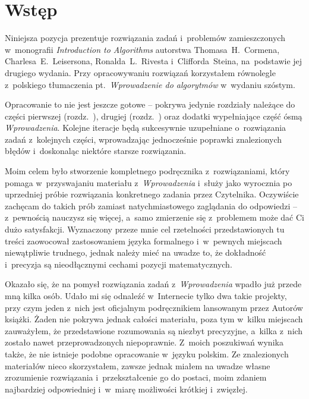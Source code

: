 \chapter{Wstęp}

Niniejsza pozycja prezentuje rozwiązania zadań i~problemów zamieszczonych w~monografii \textsl{Introduction to Algorithms} \cite{cormen} autorstwa Thomasa~H.~Cormena, Charlesa~E.~Leisersona, Ronalda~L.~Rivesta i~Clifforda~Steina, na~podstawie jej drugiego wydania. Przy opracowywaniu rozwiązań korzystałem równolegle z~polskiego tłumaczenia pt.~\textsl{Wprowadzenie do algorytmów} \cite{cormenpl} w~wydaniu szóstym.

Opracowanie to nie jest jeszcze gotowe -- pokrywa jedynie rozdziały należące do części pierwszej (rozdz.~), drugiej (rozdz.~) oraz dodatki wypełniające część ósmą \textsl{Wprowadzenia}. Kolejne iteracje będą sukcesywnie uzupełniane o~rozwiązania zadań z~kolejnych części, wprowadzając jednocześnie poprawki znalezionych błędów i~doskonaląc niektóre starsze rozwiązania.

Moim celem było stworzenie kompletnego podręcznika z~rozwiązaniami, który pomaga w~przyswajaniu materiału z~\textsl{Wprowadzenia} i~służy jako wyrocznia po uprzedniej próbie rozwiązania konkretnego zadania przez Czytelnika. Oczywiście zachęcam do takich prób zamiast natychmiastowego zaglądania do odpowiedzi -- z~pewnością nauczysz się więcej, a~samo zmierzenie się z~problemem może dać Ci dużo satysfakcji. Wyznaczony przeze mnie cel rzetelności przedstawionych tu treści zaowocował zastosowaniem języka formalnego i~w~pewnych miejscach niewątpliwie trudnego, jednak należy mieć na uwadze to, że dokładność i~precyzja są nieodłącznymi cechami pozycji matematycznych.

Okazało się, że na pomysł rozwiązania zadań z~\textsl{Wprowadzenia} wpadło już przede mną kilka osób. Udało mi się odnaleźć w~Internecie tylko dwa takie projekty, przy czym jeden z~nich jest oficjalnym podręcznikiem lansowanym przez Autorów książki. Żaden nie pokrywa jednak całości materiału, poza tym w~kilku miejscach zauważyłem, że przedstawione rozumowania są niezbyt precyzyjne, a~kilka z~nich zostało nawet przeprowadzonych niepoprawnie. Z~moich poszukiwań wynika także, że nie istnieje podobne opracowanie w~języku polskim. Ze znalezionych materiałów nieco skorzystałem, zawsze jednak miałem na uwadze własne zrozumienie rozwiązania i~przekształcenie go do postaci, moim zdaniem najbardziej odpowiedniej i~w~miarę możliwości krótkiej i~zwięzłej.

